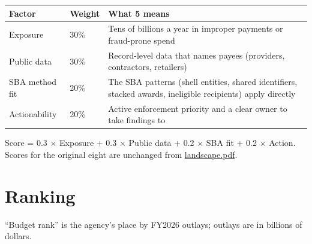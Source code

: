 \documentclass[letterpaper,11pt]{article}
\begin{document}
\begingroup\small\setlength{\tabcolsep}{4pt}\renewcommand{\arraystretch}{1.25}
\begin{longtable}[l]{@{}>{\raggedright\arraybackslash}p{}l>{\raggedright\arraybackslash}p{}@{}}
\rowcolor{coolblack}\leavevmode\color{white}\bfseries Factor & \leavevmode\color{white}\bfseries Weight & \leavevmode\color{white}\bfseries What 5 means \\
\endhead
Exposure & 30\% & Tens of billions a year in improper payments or fraud-prone spend \\
Public data & 30\% & Record-level data that names payees (providers, contractors, retailers) \\
SBA method fit & 20\% & The SBA patterns (shell entities, shared identifiers, stacked awards, ineligible recipients) apply directly \\
Actionability & 20\% & Active enforcement priority and a clear owner to take findings to \\
\end{longtable}\endgroup

Score = 0.3 × Exposure + 0.3 × Public data + 0.2 × SBA fit + 0.2 ×
Action. Scores for the original eight are unchanged from
\url{landscape.pdf}.

\hypertarget{ranking}{%
\section{Ranking}\label{ranking}}

``Budget rank'' is the agency's place by FY2026 outlays; outlays are in
billions of dollars.
\end{document}

